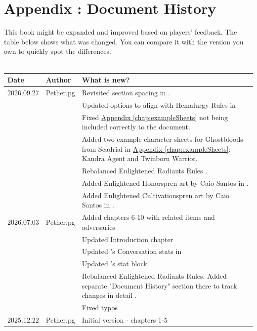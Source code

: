 \onecolumn
\chapter{Appendix \thechapter{}: Document History}

This book might be expanded and improved based on players' feedback. The table below shows what was changed. You can compare it with the version you own to quickly spot the differences. \\ \\

\begin{tabular}{p{2cm} p{2cm} p{10cm}}
	Date & Author & What is new? \\ \hline	
	
	\color{black} 2026.09.27
	& \color{black} Pether.pg
	& \color{black}  Revisited section spacing in \nameref{chap:chapter3}. \\
	
	&& \color{black} Updated \lootHemalurgicNail{} options to align with Hemalurgy Rules in \handbookMistborn{} \\
	
	&& \color{black} Fixed \hyperref[chap:exampleSheets]{Appendix \ref{chap:exampleSheets}} not being included correctly to the document.\\
	
	&& \color{black} Added two example character sheets for Ghostbloods from Scadrial in \hyperref[chap:exampleSheets]{Appendix \ref{chap:exampleSheets}}: Kandra Agent and Twinborn Warrior. \\
	
	&& \color{black} Rebalanced Enlightened Radiants Rules \seeCorruptedRules{}. \\
	
	&& \color{black} Added Enlightened Honorspren art by Caio Santos in \nameref{chap:chapter3}. \\ 
	
	&& \color{black} Added Enlightened Cultivationspren art by Caio Santos in \nameref{chap:chapter8}. \\
	
	\hline	
	
	\color{black} 2026.07.03
	& \color{black} Pether.pg
	& \color{black}  Added chapters 6-10 with related items and adversaries \\	
	&& \color{black} Updated Introduction chapter \\
	&& \color{black} Updated \enemyQueensGuardLeader{}'s Conversation stats in \fullref{sec:closedPalace} \\
	&& \color{black} Updated \enemyWallGuardHighmarshal{}'s stat block \\
	&& \color{black} Rebalanced Enlightened Radiants Rules. Added separate "Document History" section there to track changes in detail \seeCorruptedRules{}. \\
	&& \color{black} Fixed typos \\
	\hline
	
	\color{black} 2025.12.22 
	& \color{black} Pether.pg 
	& \color{black} Initial version - chapters 1-5
	\\ \hline
	
\end{tabular}

\twocolumn

